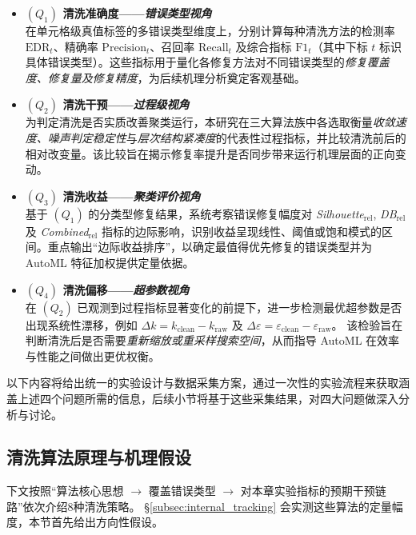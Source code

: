 \documentclass[10pt]{article} %
\numberwithin{equation}{section}
\begin{document}
\begin{itemize}
    \item \textbf{\((Q_1)\) 清洗准确度——\emph{错误类型视角}}\\
          \textcolor[rgb]{0.00,0.07,1.00}{在单元格级真值标签的多错误类型维度上，分别计算每种清洗方法的检测率 \(\mathrm{EDR}_t\)、精确率 \(\mathrm{Precision}_t\)、召回率 \(\mathrm{Recall}_t\) 及综合指标 \(\mathrm{F1}_t\)（其中下标 \(t\) 标识具体错误类型）。这些指标用于量化各修复方法对不同错误类型的\emph{修复覆盖度、修复量及修复精度}，为后续机理分析奠定客观基础。}

    \item \textbf{\((Q_2)\) 清洗干预——\emph{过程级视角}}\\
          \textcolor[rgb]{0.00,0.07,1.00}{为判定清洗是否实质改善聚类运行，本研究在三大算法族中各选取衡量\emph{收敛速度、噪声判定稳定性}与\emph{层次结构紧凑度}的代表性过程指标，并比较清洗前后的相对改变量。该比较旨在揭示修复率提升是否同步带来运行机理层面的正向变动。}

    \item \textbf{\((Q_3)\) 清洗收益——\emph{聚类评价视角}}\\
          \textcolor[rgb]{0.00,0.07,1.00}{基于 \((Q_1)\) 的分类型修复结果，系统考察错误修复幅度对 \emph{Silhouette\(_{\mathrm{rel}}\)}, \emph{DB\(_{\mathrm{rel}}\)} 及 \emph{Combined\(_{\mathrm{rel}}\)} 指标的边际影响，识别收益呈现线性、阈值或饱和模式的区间。重点输出“边际收益排序”，以确定最值得优先修复的错误类型并为 AutoML 特征加权提供定量依据。}

    \item \textbf{\((Q_4)\) 清洗偏移——\emph{超参数视角}}\\
          \textcolor[rgb]{0.00,0.07,1.00}{在 \((Q_2)\) 已观测到过程指标显著变化的前提下，进一步检测最优超参数是否出现系统性漂移，例如  
          \(\Delta k = k_{\mathrm{clean}} - k_{\mathrm{raw}}\) 及  
          \(\Delta\varepsilon = \varepsilon_{\mathrm{clean}} - \varepsilon_{\mathrm{raw}}\)。  
          该检验旨在判断清洗后是否需要\emph{重新缩放或重采样搜索空间}，从而指导 AutoML 在效率与性能之间做出更优权衡。}
\end{itemize}

\noindent
以下内容将给出统一的实验设计与数据采集方案，通过一次性的实验流程来获取涵盖上述四个问题所需的信息，后续小节将基于这些采集结果，对四大问题做深入分析与讨论。

\subsection{清洗算法原理与机理假设}
\label{sec:clean-principle}
下文按照“算法核心思想 $\rightarrow$ 覆盖错误类型
$\rightarrow$ 对本章实验指标的预期干预链路”依次介绍8种清洗策略。
\S\ref{subsec:internal_tracking} 会实测这些算法的定量幅度，本节首先给出方向性假设。
\end{document}
